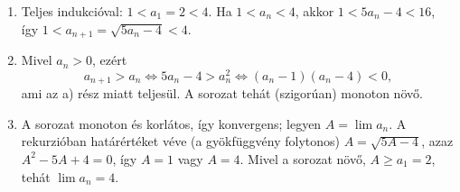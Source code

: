 \documentclass[11pt]{scrartcl}
\begin{document}
\begin{enumerate}
	\item Teljes indukcióval: $1 < a_1 = 2 < 4$. Ha $1 < a_n < 4$, akkor
	      $1 < 5a_n - 4 < 16$, így
	      $1 < a_{n + 1} = \sqrt{5a_n - 4} < 4$.

	\item Mivel $a_n > 0$, ezért
	      \[
		      a_{n + 1} > a_n
		      \iff 5a_n - 4 > a_n^2
		      \iff (a_n - 1)(a_n - 4) < 0,
	      \]
	      ami az a) rész miatt teljesül. A sorozat tehát (szigorúan) monoton
	      növő.

	\item A sorozat monoton és korlátos, így konvergens; legyen
	      $A = \lim a_n$. A rekurzióban határértéket véve (a gyökfüggvény
	      folytonos) $A = \sqrt{5A - 4}$, azaz $A^2 - 5A + 4 = 0$, így $A = 1$
	      vagy $A = 4$. Mivel a sorozat növő, $A \ge a_1 = 2$, tehát
	      $\lim a_n = 4$.
\end{enumerate}
\end{document}
